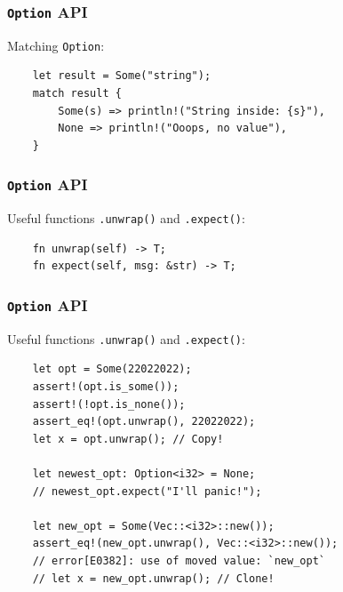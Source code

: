 \documentclass[aspectratio=1610,t]{beamer}
\begin{document}

\begin{frame}[fragile]
\frametitle{\texttt{Option} API}
Matching \texttt{Option}:

\begin{verbatim}
    let result = Some("string");
    match result {
        Some(s) => println!("String inside: {s}"),
        None => println!("Ooops, no value"),
    }
\end{verbatim}
\end{frame}


\begin{frame}[fragile]
\frametitle{\texttt{Option} API}
Useful functions \texttt{.unwrap()} and \texttt{.expect()}:

\begin{verbatim}
    fn unwrap(self) -> T;
    fn expect(self, msg: &str) -> T;
\end{verbatim}
\end{frame}


\begin{frame}[fragile]
\frametitle{\texttt{Option} API}
Useful functions \texttt{.unwrap()} and \texttt{.expect()}:

\begin{verbatim}
    let opt = Some(22022022);
    assert!(opt.is_some());
    assert!(!opt.is_none());
    assert_eq!(opt.unwrap(), 22022022);
    let x = opt.unwrap(); // Copy!

    let newest_opt: Option<i32> = None;
    // newest_opt.expect("I'll panic!");

    let new_opt = Some(Vec::<i32>::new());
    assert_eq!(new_opt.unwrap(), Vec::<i32>::new());
    // error[E0382]: use of moved value: `new_opt`
    // let x = new_opt.unwrap(); // Clone!
\end{verbatim}
\end{frame}
 
\end{document}
